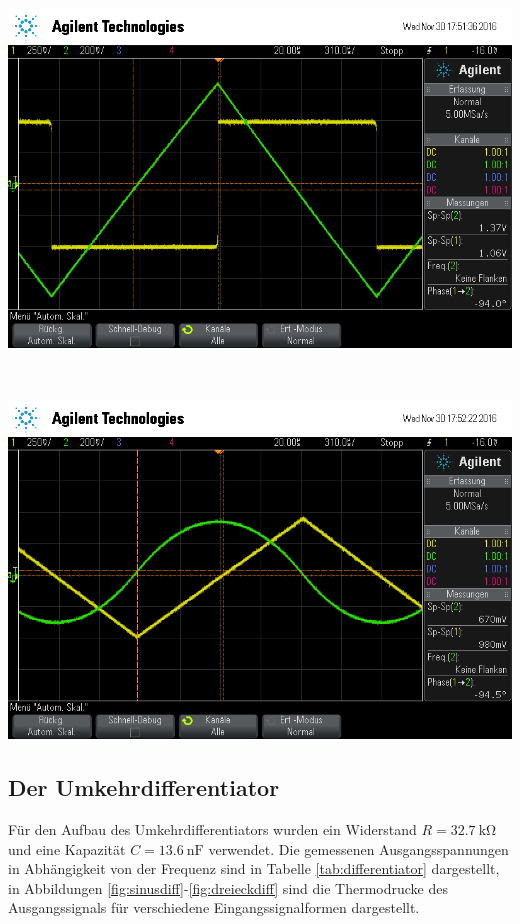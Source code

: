 \documentclass[]{scrartcl}
\begin{document}
\begin{minipage}[t]{0.5\textwidth}
	\includegraphics[width=\textwidth]{images/rechteck_int}
	\label{fig:rechteckint}
\end{minipage} \\
\begin{minipage}[t]{0.5\textwidth}
	\includegraphics[width=\textwidth]{images/dreieck_int}
	\label{fig:dreieckint}
\end{minipage}

\subsection{Der Umkehrdifferentiator}
Für den Aufbau des Umkehrdifferentiators wurden ein Widerstand $R=\SI{32.7}{\kilo\ohm}$ und eine Kapazität $C=\SI{13.6}{\nano\farad}$ verwendet. Die gemessenen Ausgangsspannungen in Abhängigkeit von der Frequenz sind in Tabelle \ref{tab:differentiator} dargestellt, in Abbildungen \ref{fig:sinusdiff}-\ref{fig:dreieckdiff} sind die Thermodrucke des Ausgangssignals für verschiedene Eingangssignalformen dargestellt.
\end{document}

